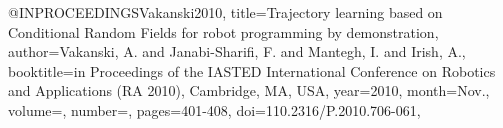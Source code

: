 @INPROCEEDINGS{Vakanski2010,
title={Trajectory learning based on Conditional Random Fields for robot programming by demonstration},
author={Vakanski, A. and Janabi-Sharifi, F. and Mantegh, I. and Irish, A.},
booktitle={in Proceedings of the IASTED International Conference on Robotics and Applications (RA 2010), Cambridge, MA, USA},
year={2010},
month={Nov.},
volume={},
number={},
pages={401-408},
doi={110.2316/P.2010.706-061}, } 